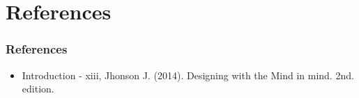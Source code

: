 \documentclass[11pt]{beamer}
\begin{document}
\section{References}
\begin{frame}
\frametitle{References}
\begin{itemize}
\item Introduction - xiii, Jhonson J. (2014). Designing with the Mind in mind. 2nd. edition.
\end{itemize}
\end{frame}
\end{document}

